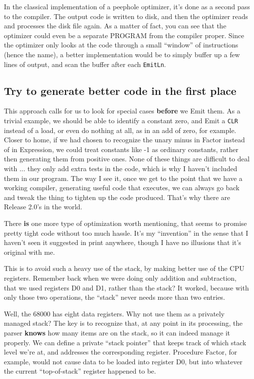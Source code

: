 In  the  classical  implementation  of a peephole optimizer, it's done as a second pass to the compiler. The  output code is  written  to  disk, and  then  the  optimizer  reads  and processes the disk file again. As a matter of fact, you can see that the optimizer could  even be a separate PROGRAM from the compiler proper. Since the optimizer only  looks  at the code through a  small  ``window''  of  instructions  (hence the name), a better implementation would be to simply buffer up a few lines of output, and scan the buffer after each {\tt EmitLn}.

\subsection{Try to generate better code in the first place}

This approach calls for us to look for  special  cases {\bfseries before} we Emit them. As a trivial example, we  should  be  able to identify a constant zero, and  Emit a {\tt CLR} instead of a load, or even do nothing at all, as in an add of zero, for example. Closer to home, if we had chosen to recognize the unary minus in Factor  instead of in Expression, we could treat constants like -1 as ordinary constants, rather  then  generating them from  positive  ones. None of these things are difficult to deal with ... they only add extra tests in the code, which is why  I  haven't  included them in our program. The way I see it, once we get to the point that we have a working compiler, generating useful code  that  executes, we can always go back and tweak the thing to tighten up the code produced. That's why there are Release 2.0's in the world.

There {\bfseries is} one more type  of  optimization  worth  mentioning, that seems to promise pretty tight code without too much hassle. It's my ``invention'' in the  sense  that I haven't seen it suggested in print anywhere, though I have  no  illusions  that  it's original with me.

This  is to avoid such a heavy use of the stack, by making better use of the CPU registers. Remember back when we were  doing only addition  and  subtraction, that we used registers  D0  and  D1, rather than the stack?  It worked, because with  only  those  two operations, the ``stack'' never needs more than two entries.

Well, the 68000 has eight data registers. Why not use them as a privately managed stack?  The key is to recognize  that, at  any point in its processing, the  parser {\bfseries knows} how many items are on the  stack, so it can indeed manage it properly. We can define a private ``stack pointer'' that keeps  track  of  which  stack level we're at, and addresses the  corresponding  register. Procedure Factor, for  example, would  not  cause data to be loaded  into register  D0, but   into  whatever  the  current  ``top-of-stack'' register happened to be.


